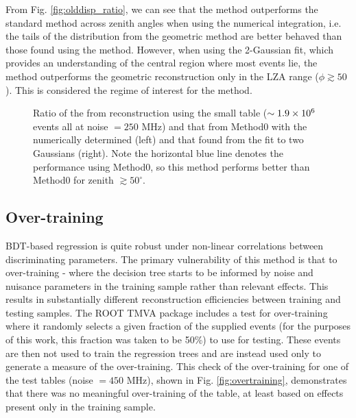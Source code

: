 \documentclass[main.tex]{subfiles}
\begin{document}
From Fig. \ref{fig:olddisp_ratio}, we can see that the \disp method outperforms the standard method across zenith angles when using the numerical integration, i.e. the tails of the distribution from the geometric method are better behaved than those found using the \disp method. However, when using the 2-Gaussian fit, which provides an understanding of the central region where most events lie, the \disp method outperforms the geometric reconstruction only in the LZA range ($\phi\gtrsim 50$). This is considered the regime of interest for the \disp method.

\begin{figure}[H]
  \centering
  \caption[Small \disp table reconstruction (noise = $250$ MHz).]{Ratio of the \rse from reconstruction using the small \disp table ($\sim 1.9\times 10^{6}$ events all at noise $= 250$ MHz) and that from Method0 with the numerically determined \rse (left) and that found from the fit to two Gaussians (right). Note the horizontal blue line denotes the performance using Method0, so this method performs better than Method0 for zenith $\gtrsim 50^\circ$.}
  \label{fig:disp_ratio_250}
\end{figure}

\subsection{Over-training}
BDT-based regression is quite robust under non-linear correlations between discriminating parameters. The primary vulnerability of this method is that  to over-training - where the decision tree starts to be informed by noise and nuisance parameters in the training sample rather than relevant effects. This results in substantially different reconstruction efficiencies between training and testing samples. The ROOT TMVA package includes a test for over-training where it randomly selects a given fraction of the supplied events (for the purposes of this work, this fraction was taken to be 50\%) to use for testing. These events are then not used to train the regression trees and are instead used only to generate a measure of the over-training.
This check of the over-training for one of the test tables (noise $= 450$ MHz), shown in Fig. \ref{fig:overtraining}, demonstrates that there was no meaningful over-training of the table, at least based on effects present only in the training sample.
\end{document}
